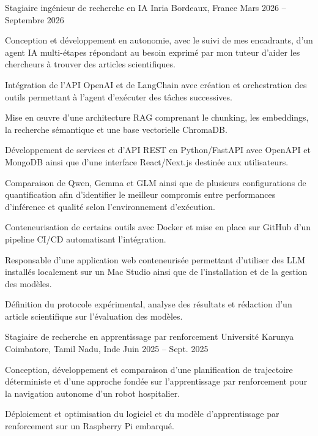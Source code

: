 
\begin{cventries}
  \cventry
    {Stagiaire ingénieur de recherche en IA}
    {Inria}
    {Bordeaux, France}
    {Mars 2026 -- Septembre 2026}
    {
      \begin{cvitems}
        \item {Conception et développement en autonomie, avec le suivi de mes encadrants, d’un agent IA multi-étapes répondant au besoin exprimé par mon tuteur d’aider les chercheurs à trouver des articles scientifiques.}
        \item {Intégration de l’API OpenAI et de LangChain avec création et orchestration des outils permettant à l’agent d’exécuter des tâches successives.}
        \item {Mise en œuvre d’une architecture RAG comprenant le chunking, les embeddings, la recherche sémantique et une base vectorielle ChromaDB.}
        \item {Développement de services et d’API REST en Python/FastAPI avec OpenAPI et MongoDB ainsi que d’une interface React/Next.js destinée aux utilisateurs.}
        \item {Comparaison de Qwen, Gemma et GLM ainsi que de plusieurs configurations de quantification afin d’identifier le meilleur compromis entre performances d’inférence et qualité selon l’environnement d’exécution.}
        \item {Conteneurisation de certains outils avec Docker et mise en place sur GitHub d’un pipeline CI/CD automatisant l’intégration.}
        \item {Responsable d’une application web conteneurisée permettant d’utiliser des LLM installés localement sur un Mac Studio ainsi que de l’installation et de la gestion des modèles.}
        \item {Définition du protocole expérimental, analyse des résultats et rédaction d’un article scientifique sur l’évaluation des modèles.}
      \end{cvitems}
    }

  \cventry
    {Stagiaire de recherche en apprentissage par renforcement}
    {Université Karunya}
    {Coimbatore, Tamil Nadu, Inde}
    {Juin 2025 -- Sept. 2025}
    {
      \begin{cvitems}
        \item {Conception, développement et comparaison d’une planification de trajectoire déterministe et d’une approche fondée sur l’apprentissage par renforcement pour la navigation autonome d’un robot hospitalier.}
        \item {Déploiement et optimisation du logiciel et du modèle d’apprentissage par renforcement sur un Raspberry Pi embarqué.}
      \end{cvitems}
    }
\end{cventries}
